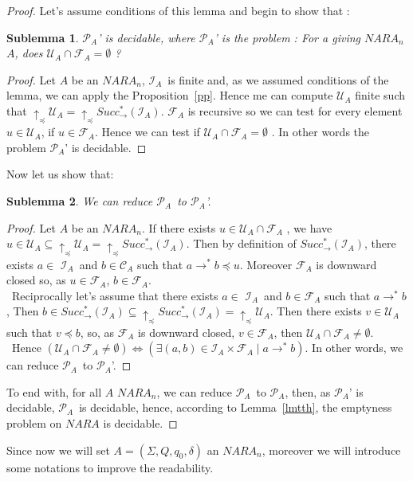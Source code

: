 \documentclass[a4paper,10pt]{report}
\newtheorem{slm}{Sublemma}[lm]
\newcommand{\C}{\mathcal{C}_{A}}
\newcommand{\I}{\mathcal{I}_{A}}
\newcommand{\F}{\mathcal{F}_{A}}
\newcommand{\U}{\mathcal{U}_{A}}
\newcommand{\pb}{$\mathcal{P}_{A}$}
\begin{document}
\begin{proof}
  Let's assume conditions of this lemma and begin to show that :
  \begin{slm}	
    \pb' is decidable, where \pb' is the problem : For a giving $NARA_n$ $A$, does $\U \cap \F =\emptyset$ ? 
   
  \end{slm}
  \begin{proof}
  Let $A$ be an $NARA_n$,
  $\I$\ is finite and, as we assumed conditions of the lemma, we can apply the Proposition~\ref{pp}.
  Hence me can compute $\U$ finite such that $\uparrow_\preceq \U=\uparrow_\preceq Succ^*_\rightarrow (\I)$.
  $\F$ is recursive so we can test for every element $u \in \U$, if $u \in\F$. Hence we can test if $\U \cap\F=\emptyset$ . 
  In other words the problem \pb' is decidable.
  \end{proof}
  Now let us show that:
  \begin{slm}	
    We can reduce \pb\ to \pb'.
  \end{slm}
  \begin{proof}
  Let $A$ be an $NARA_n$.
  If there exists $u \in \U \cap \F$ , we have $u\in \U \subseteq \uparrow_\preceq  \U =\uparrow_\preceq Succ^*_\rightarrow (\I)$. 
  Then by definition of $Succ^*_\rightarrow (\I)$, there exists $a\in$ $\I$\ and $b \in\C$ such that $a \rightarrow^* b \preceq u$.
  Moreover $\F$ is downward closed so, as $u \in \F$,  $b \in \F$.\\\
  Reciprocally let's assume that there exists $a\in$ $\I$\ and $b \in\F$ such that $a \rightarrow^* b $,
  Then $b \in  Succ^*_\rightarrow (\I) \subseteq \uparrow_\preceq Succ^*_\rightarrow (\I)=\uparrow_\preceq  \U$. 
  Then there exists $v \in \U$ such that $v \preceq b$, so, as $\F$ is downward closed, $v \in \F$, then $\U \cap \F \neq \emptyset$.\\\
  Hence $(\U \cap \F \neq \emptyset) \Leftrightarrow (\exists (a,b)\in \I \times \F \mid a \rightarrow^* b )$.
  In other words, we can reduce \pb\ to \pb'.  
  \end{proof}
  To end with, for all $A$  $NARA_n$, we can reduce \pb\ to \pb, then, as \pb' is decidable, \pb\ is decidable, hence, according to Lemma~\ref{lmtth}, the emptyness problem on $NARA$ is decidable.
\end{proof}

Since now we will set $A =(\Sigma ,Q ,q_0, \delta )$ an $NARA_n$, moreover we will introduce some notations to improve the readability.
\end{document}
